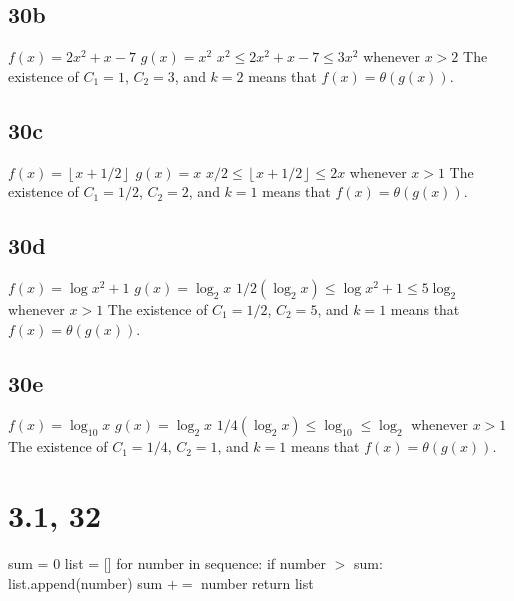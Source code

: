 \documentclass{article}
\begin{document}
\subsection{30b}
$f(x) = 2x^2 + x - 7$
\newline
$g(x) = x^2$
\newline
$x^2 \leq 2x^2 + x - 7 \leq 3x^2$ whenever $x > 2$
\newline
The existence of $C_{1} = 1$, $C_{2} = 3$, and $k = 2$ means that $f(x) = \theta (g(x))$.

\subsection{30c}
$f(x) = \left \lfloor{x + 1/2}\right \rfloor$
\newline
$g(x) = x$
\newline
$x/2 \leq \left \lfloor{x + 1/2}\right \rfloor \leq 2x$ whenever $x > 1$
\newline
The existence of $C_{1} = 1/2$, $C_{2} = 2$, and $k = 1$ means that $f(x) = \theta (g(x))$.

\subsection{30d}
$f(x) = \log{x^2 + 1}$
\newline
$g(x) = \log_2 x$
\newline
$1/2(\log_2 x) \leq \log{x^2 + 1} \leq 5\log_2$ whenever $x > 1$
\newline
The existence of $C_{1} = 1/2$, $C_{2} = 5$, and $k = 1$ means that $f(x) = \theta (g(x))$.

\subsection{30e}
$f(x) = \log_{10} x$
\newline
$g(x) = \log_2 x$
\newline
$1/4(\log_2 x) \leq \log_{10} \leq \log_2$ whenever $x > 1$
\newline
The existence of $C_{1} = 1/4$, $C_{2} = 1$, and $k = 1$ means that $f(x) = \theta (g(x))$.

\section{3.1, 32}
sum = 0
\newline
list = []
\newline
for number in sequence:
\newline
\indent if number $>$ sum:
\newline
\indent \indent list.append(number)
\newline
\indent sum $+=$ number
\newline
return list
\end{document}
